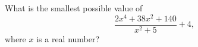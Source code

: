 What is the smallest possible value of
\[\dfrac{2x^4+38x^2+140}{x^2+5}+4,\]
where $x$ is a real number?

